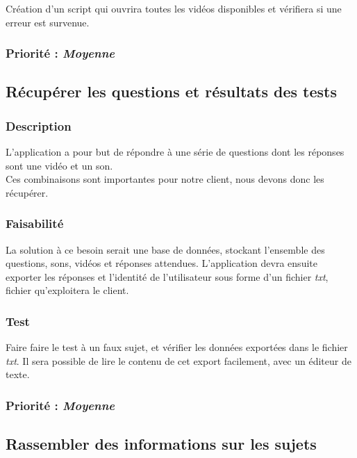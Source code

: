 Création d’un script qui ouvrira toutes les vidéos disponibles et vérifiera si une erreur est survenue.

\subsubsection{Priorité : \textit{Moyenne}}

\subsection{Récupérer les questions et résultats des tests}

\subsubsection{Description}

L’application a pour but de répondre à une série de questions dont les réponses sont une vidéo et un son.\\
Ces combinaisons sont importantes pour notre client, nous devons donc les récupérer.

\subsubsection{Faisabilité}

La solution à ce besoin serait une base de données, stockant l’ensemble des questions, sons, vidéos et réponses attendues.
L’application devra ensuite exporter les réponses et l'identité de l'utilisateur sous forme d’un fichier \textit{txt}, fichier qu’exploitera le client.   

\subsubsection{Test}

Faire faire le test à un faux sujet, et vérifier les données exportées dans le fichier \textit{txt}. Il sera possible de lire le contenu de cet export facilement, avec un éditeur de texte.

\subsubsection{Priorité : \textit{Moyenne}}

\subsection{Rassembler des informations sur les sujets}

